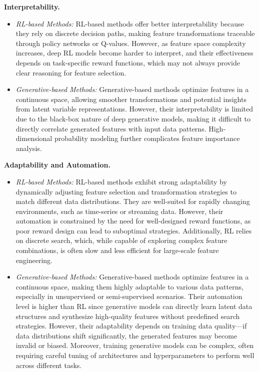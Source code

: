 \noindent
\textbf{Interpretability.}
\begin{itemize}
    \item \emph{RL-based Methods:} RL-based methods offer better interpretability because they rely on discrete decision paths, making feature transformations traceable through policy networks or Q-values. However, as feature space complexity increases, deep RL models become harder to interpret, and their effectiveness depends on task-specific reward functions, which may not always provide clear reasoning for feature selection.
    \item \emph{Generative-based Methods:} Generative-based methods optimize features in a continuous space, allowing smoother transformations and potential insights from latent variable representations. However, their interpretability is limited due to the black-box nature of deep generative models, making it difficult to directly correlate generated features with input data patterns. High-dimensional probability modeling further complicates feature importance analysis.
\end{itemize}

\noindent
\textbf{Adaptability and Automation.}
\begin{itemize}
    \item \emph{RL-based Methods:} RL-based methods exhibit strong adaptability by dynamically adjusting feature selection and transformation strategies to match different data distributions. They are well-suited for rapidly changing environments, such as time-series or streaming data. However, their automation is constrained by the need for well-designed reward functions, as poor reward design can lead to suboptimal strategies. Additionally, RL relies on discrete search, which, while capable of exploring complex feature combinations, is often slow and less efficient for large-scale feature engineering.
    \item \emph{Generative-based Methods:} Generative-based methods optimize features in a continuous space, making them highly adaptable to various data patterns, especially in unsupervised or semi-supervised scenarios. Their automation level is higher than RL since generative models can directly learn latent data structures and synthesize high-quality features without predefined search strategies. However, their adaptability depends on training data quality—if data distributions shift significantly, the generated features may become invalid or biased. Moreover, training generative models can be complex, often requiring careful tuning of architectures and hyperparameters to perform well across different tasks.
\end{itemize}
\vspace{-0.4cm}
